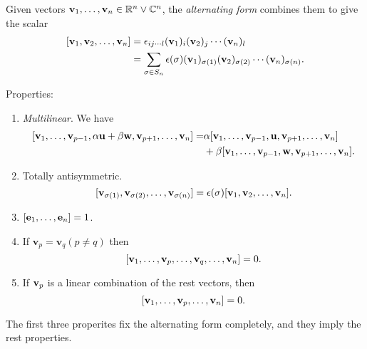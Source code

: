 \documentclass[10pt]{article}
\begin{document}
    \begin{definition}
        Given vectors $ {\bf v}_1,\dots,{\bf v}_n \in \mathbb{R}^{n}\lor \mathbb{C}^{n} $, the \textit{alternating form} combines them to give the scalar 
        \[
            \begin{aligned}
                [\bfv_1,\bfv_2,\dots,\bfv_n]&= \epsilon_{ij\cdots l}(\bfv_1)_{i}(\bfv_2)_j\cdots (\bfv_n)_l\\
                &= \sum_{\sigma\in S_n}\epsilon(\sigma)(\bfv_1)_{\sigma(1)}(\bfv_2)_{\sigma(2)}\cdots (\bfv_n)_{\sigma(n)}.
            \end{aligned}
        \]
    \end{definition}
    Properties:
    \begin{enumerate}
        \item \textit{Multilinear}. We have 
        \[
            \begin{aligned}
                [\bfv_1,\dots,\bfv_{p-1},\alpha\bfu+\beta\bfw,\bfv_{p+1},\dots,\bfv_n]=&\alpha[\bfv_1,\dots,\bfv_{p-1},\bfu,\bfv_{p+1},\dots,\bfv_n]\\
                &+\beta[\bfv_1,\dots,\bfv_{p-1},\bfw,\bfv_{p+1},\dots,\bfv_n].
            \end{aligned}
        \]
        \item Totally antisymmetric.
        \[
            [{\bf v}_{\sigma(1)},{\bf v}_{\sigma(2)},\dots,{\bf v}_{\sigma(n)}]=\epsilon(\sigma)[{\bf v}_1,{\bf v}_2,\dots,{\bf v}_n]
        .\]
        \item $ [{\bf e}_1,\dots,{\bf e}_n]=1 $.
        \item If $ \mathbf{v}_p=\mathbf{v}_q (p\neq q) $ then 
        \[
            [{\bf v}_1,\dots,{\bf v}_p,\dots,{\bf v}_q,\dots,{\bf v}_n]=0
        .\]
        \item If $ {\bf v}_p $ is a linear combination of the rest vectors, then 
        \[
            [{\bf v}_1,\dots,{\bf v}_p,\dots,{\bf v}_n]=0
        .\]
    \end{enumerate}
    The first three properites fix the alternating form completely, and they imply the rest properties.
\end{document}
